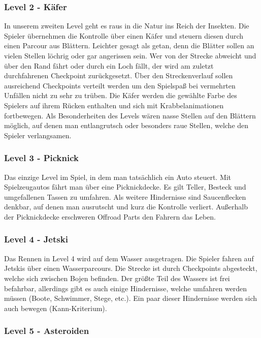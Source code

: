 \subsubsection{Level 2 - Käfer}

In unserem zweiten Level geht es raus in die Natur ins Reich der Insekten. Die Spieler übernehmen die Kontrolle über einen Käfer und steuern diesen durch einen Parcour aus Blättern. Leichter gesagt als getan, denn die Blätter sollen an vielen Stellen löchrig oder gar angerissen sein. Wer von der Strecke abweicht und über den Rand fährt oder durch ein Loch fällt, der wird am zuletzt durchfahrenen Checkpoint zurückgesetzt. Über den Streckenverlauf sollen ausreichend Checkpoints verteilt werden um den Spielspaß bei vermehrten Unfällen nicht zu sehr zu trüben. Die Käfer werden die gewählte Farbe des Spielers auf ihrem Rücken enthalten und sich mit Krabbelanimationen fortbewegen. Als Besonderheiten des Levels wären nasse Stellen auf den Blättern möglich, auf denen man entlangrutsch oder besonders raue Stellen, welche den Spieler verlangsamen.

\subsubsection{Level 3 - Picknick}

Das einzige Level im Spiel, in dem man tatsächlich ein Auto steuert. Mit Spielzeugautos fährt man über eine Picknickdecke. Es gilt Teller, Besteck und umgefallenen Tassen zu umfahren. Als weitere Hindernisse sind Saucenflecken denkbar, auf denen man ausrutscht und kurz die Kontrolle verliert. Außerhalb der Picknickdecke erschweren Offroad Parts den Fahrern das Leben.

\subsubsection{Level 4 - Jetski}

Das Rennen in Level 4 wird auf dem Wasser ausgetragen. Die Spieler fahren auf Jetskis über einen Wasserparcours. Die Strecke ist durch Checkpoints abgesteckt, welche sich zwischen Bojen befinden. Der größte Teil des Wassers ist frei befahrbar, allerdings gibt es auch einige Hindernisse, welche umfahren werden müssen (Boote, Schwimmer, Stege, etc.). Ein paar dieser Hindernisse werden sich auch bewegen (Kann-Kriterium).

\subsubsection{Level 5 - Asteroiden}

